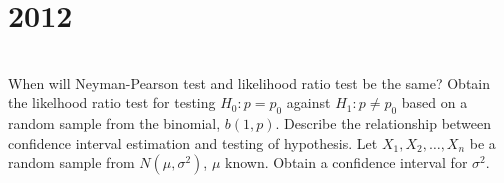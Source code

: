 \section*{2012}
\vspace{-.5cm}
\hrulefill \smallskip\\
 When will Neyman-Pearson test and likelihood ratio test be the same? Obtain the likelhood ratio test for testing $H_0 : p = p_0$ against $H_1 : p \neq p_0$ based on a random sample from the binomial, $b(1,p)$.
\myline
{} Describe the relationship between confidence interval estimation and testing of hypothesis. Let $X_1,X_2,\dotsc,X_n$ be a random sample from $N(\mu,\sigma^2)$, $\mu$ known. Obtain a confidence interval for $\sigma^2$.